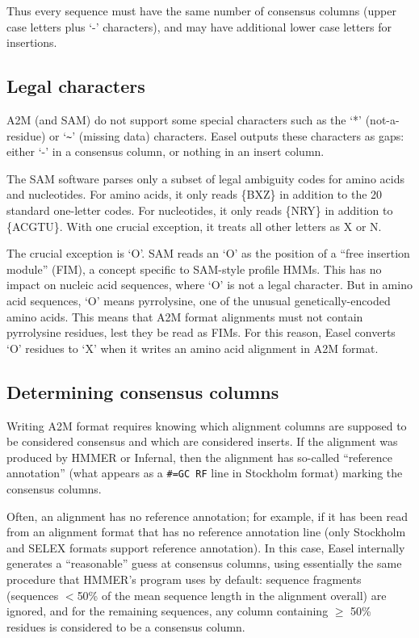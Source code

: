 Thus every sequence must have the same number of consensus columns
(upper case letters plus `-' characters), and may have additional lower
case letters for insertions.

\subsection{Legal characters}

A2M (and SAM) do not support some special characters such as the `*'
(not-a-residue) or `\verb+~+' (missing data) characters. Easel outputs these
characters as gaps: either `-' in a consensus column, or nothing in an
insert column.

The SAM software parses only a subset of legal ambiguity codes for
amino acids and nucleotides. For amino acids, it only reads \{BXZ\} in
addition to the 20 standard one-letter codes. For nucleotides, it only
reads \{NRY\} in addition to \{ACGTU\}. With one crucial exception, it
treats all other letters as X or N. 

The crucial exception is `O'. SAM reads an `O' as the position of a
``free insertion module'' (FIM), a concept specific to SAM-style
profile HMMs. This has no impact on nucleic acid sequences, where `O'
is not a legal character. But in amino acid sequences, `O' means
pyrrolysine, one of the unusual genetically-encoded amino acids.  This
means that A2M format alignments must not contain pyrrolysine
residues, lest they be read as FIMs. For this reason, Easel converts
`O' residues to `X' when it writes an amino acid alignment in A2M
format.

\subsection{Determining consensus columns}

Writing A2M format requires knowing which alignment columns are
supposed to be considered consensus and which are considered
inserts. If the alignment was produced by HMMER or Infernal, then the
alignment has so-called ``reference annotation'' (what appears as a
\verb+#=GC RF+ line in Stockholm format) marking the consensus
columns. 

Often, an alignment has no reference annotation; for example, if it
has been read from an alignment format that has no reference
annotation line (only Stockholm and SELEX formats support reference
annotation). In this case, Easel internally generates a ``reasonable''
guess at consensus columns, using essentially the same procedure that
HMMER's  program uses by default: sequence fragments
(sequences $<$50\% of the mean sequence length in the alignment
overall) are ignored, and for the remaining sequences, any column
containing $\geq$ 50\% residues is considered to be a consensus
column.










